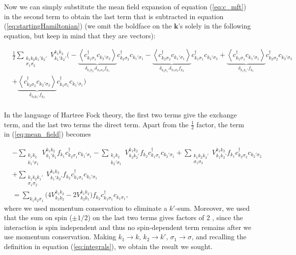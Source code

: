 Now we can simply substitute the mean field expansion of equation (\ref{eq:c_mft}) in the second term to  obtain the last term that is subtracted in equation (\ref{eq:startingHamiltonian}) (we omit the boldface on the $\bm k$'s solely in the following equation, but keep in mind that they are vectors):

\begin{equation}\label{eq:mean_field}
\begin{split}
&\frac{1}{2} \sum_{\substack{ k_1 k_2 k_1' k_2' \\ \sigma_1 \sigma_2} } V^{k_1 k_2}_{k_1' k_2'} \bigg( - \underbrace{\left\langle c_{k_1 \sigma_1}^\dagger c_{k_2' \sigma_2} \right\rangle}_{\delta_{k_1 k_2'} \delta_{\sigma_1 \sigma_2} f_{k_1} } c_{k_2 \sigma_2}^\dagger c_{k_1' \sigma_1}  - \underbrace{\left\langle c_{k_2 \sigma_2}^\dagger c_{k_1' \sigma_1}  \right\rangle}_{\delta_{k_2 k_1'} \delta_{\sigma_1 \sigma_2} f_{k_2} } c_{k_1 \sigma_1}^\dagger c_{k_2' \sigma_2} + \underbrace{\left\langle c_{k_1 \sigma_1}^\dagger c_{k_1' \sigma_1} \right\rangle}_{\delta_{k_1 k_1'} f_{k_1} } c_{k_2 \sigma_2}^\dagger c_{k_2' \sigma_2}  \\
& + \underbrace{\left\langle c_{k_2 \sigma_2}^\dagger c_{k_2' \sigma_2} \right\rangle}_{\delta_{k_2 k_2'} f_{k_2} } c_{k_1 \sigma_1}^\dagger c_{k_1' \sigma_1} \bigg)\\
\end{split}
\end{equation}

In the language of Hartree Fock theory, the first two terms give the exchange term, and the last two terms the direct term. Apart from the $\frac{1}{2}$ factor, the term in (\ref{eq:mean_field}) becomes

\begin{equation}
\begin{split}
&- \sum_{\substack{k_1 k_2 \\ k_1' \sigma_1}} V_{k_1' k_1}^{k_1 k_2} f_{k_1} c_{k_2 \sigma_1}^\dagger c_{k_1' \sigma_1}  - \sum_{\substack{k_1 k_2 \\ k_2' \sigma_1}} V_{k_2 k_2'}^{k_1 k_2} f_{k_2} c_{k_1 \sigma_1}^\dagger c_{k_2' \sigma_1} + \sum_{\substack{k_1 k_2 k_2' \\ \sigma_1 \sigma_2}} V_{k_1 k_2'}^{k_1 k_2} f_{k_1} c_{k_2 \sigma_2}^\dagger c_{k_2' \sigma_2} \\
& + \sum_{\substack{k_1 k_2 k_1' \\  \sigma_1 \sigma_2}} V_{k_1' k_2'}^{k_1 k_2} f_{k_2} c_{k_1 \sigma_1}^\dagger c_{k_1' \sigma_1} \\
&= \sum_{k_1 k_2 \sigma_1} \bigg( 4 V_{k_1 k_2}^{k_1 k_2} - 2  V_{k_2 k_1}^{k_1 k_2}  \bigg) f_{k_2} c_{k_1 \sigma_1}^\dagger c_{k_1 \sigma_1}
,
\end{split}
\end{equation}
where we used momentum conservation to eliminate a $k'$-sum. Moreover, we used that the sum on spin ($\pm 1/2$) on the last two terms gives factors of 2 , since the interaction is spin independent and thus no spin-dependent term remains after we use momentum conservation. Making $k_1 \rightarrow k , \, k_2 \rightarrow k', \, \sigma_1 \rightarrow \sigma$, and recalling the definition in equation (\ref{eq:integrals}), we obtain the result we sought.

